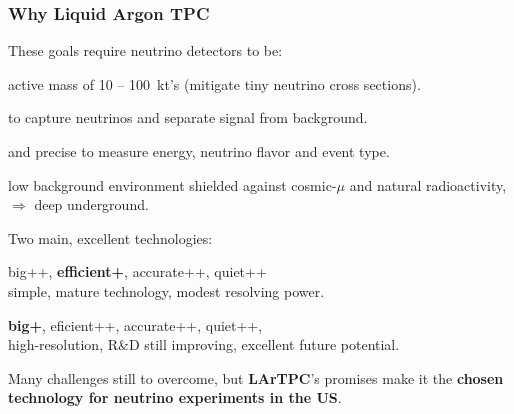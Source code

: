 \documentclass[xcolor=dvipsnames]{beamer}
\begin{document}
\begin{frame}
  \frametitle{Why Liquid Argon TPC}
  These goals require neutrino detectors to be:
  \begin{description}\footnotesize
  \item[big] active mass of \num{10} -- \SI{100}{\kilo\tonne}'s (mitigate tiny neutrino cross sections).
  \item[efficient] to capture neutrinos and separate signal from background.
  \item[accurate] and precise to measure energy, neutrino flavor and event type.
  \item[quiet] low background environment shielded against
    cosmic-$\mu$ and natural radioactivity, $\Rightarrow$ deep
    underground.
  \end{description}

  Two main, excellent technologies:
  \begin{description}\footnotesize
  \item[Water Cherenkov] big++, \textbf{efficient+}, accurate++, quiet++\\
    simple, mature technology, modest resolving power.
  \item[LArTPC] \textbf{big+}, eficient++, accurate++, quiet++, \\
    high-resolution, R\&D still improving, excellent future potential.
  \end{description}

  Many challenges still to overcome, but \textbf{LArTPC}'s promises make it the
  \textbf{chosen technology for neutrino experiments in the US}.
\end{frame}
\end{document}
